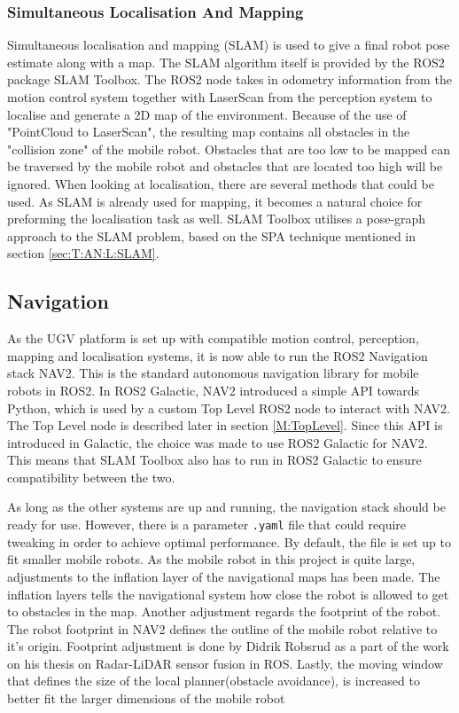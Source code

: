 \subsubsection{Simultaneous Localisation And Mapping}
Simultaneous localisation and mapping (SLAM) is used to give a final robot pose estimate along with a map. The SLAM algorithm itself is provided by the ROS2 package SLAM Toolbox. The ROS2 node takes in odometry information from the motion control system together with LaserScan from the perception system to localise and generate a 2D map of the environment. Because of the use of "PointCloud to LaserScan", the resulting map contains all obstacles in the "collision zone" of the mobile robot. Obstacles that are too low to be mapped can be traversed by the mobile robot and obstacles that are located too high will be ignored. When looking at localisation, there are several methods that could be used. As SLAM is already used for mapping, it becomes a natural choice for preforming the localisation task as well. SLAM Toolbox utilises a pose-graph approach to the SLAM problem, based on the SPA technique mentioned in section \ref{sec:T:AN:L:SLAM}.


\subsection{Navigation}
As the UGV platform is set up with compatible motion control, perception, mapping and localisation systems, it is now able to run the ROS2 Navigation stack NAV2. This is the standard autonomous navigation library for mobile robots in ROS2. In ROS2 Galactic, NAV2 introduced a simple API towards Python, which is used by a custom Top Level ROS2 node to interact with NAV2. The Top Level node is described later in section \ref{M:TopLevel}. Since this API is introduced in Galactic, the choice was made to use ROS2 Galactic for NAV2. This means that SLAM Toolbox also has to run in ROS2 Galactic to ensure compatibility between the two.

As long as the other systems are up and running, the navigation stack should be ready for use. However, there is a parameter \lstinline{.yaml} file that could require tweaking in order to achieve optimal performance. By default, the file is set up to fit smaller mobile robots. As the mobile robot in this project is quite large, adjustments to the inflation layer of the navigational maps has been made. The inflation layers tells the navigational system how close the robot is allowed to get to obstacles in the map. Another adjustment regards the footprint of the robot. The robot footprint in NAV2 defines the outline of the mobile robot relative to it's origin. Footprint adjustment is done by Didrik Robsrud as a part of the work on his thesis on Radar-LiDAR sensor fusion in ROS. Lastly, the moving window that defines the size of the local planner(obstacle avoidance), is increased to better fit the larger dimensions of the mobile robot

